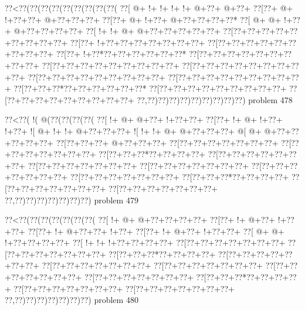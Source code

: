\vbox{\vbox{\goo
\0??<\0??(\0??(\0??(\0??(\0??(\0??(\0??(\0??(\0??(
\0??[\- @+\- !+\- !+\- !+\- !+\- @+\0??+\- @+\0??+
\0??[\0??+\- @+\- !+\0??+\0??+\- @+\0??+\0??+\0??+
\0??[\0??+\- @+\- !+\0??+\- @+\0??+\0??+\0??+\0??*
\0??[\- @+\- @+\- !+\0??+\- @+\0??+\0??+\0??+\0??+
\0??[\- !+\- !+\- @+\- @+\0??+\0??+\0??+\0??+\0??+
\0??[\0??+\0??+\0??+\0??+\0??+\0??+\0??+\0??+\0??+
\0??[\0??+\- !+\0??+\0??+\0??+\0??+\0??+\0??+\0??+
\0??[\0??+\0??+\0??+\0??+\0??+\0??+\0??+\0??+\0??+
\0??[\0??+\- !+\0??*\0??+\0??+\0??+\0??+\0??+\0??*
\0??[\0??+\0??+\0??+\0??+\0??+\0??+\0??+\0??+\0??+
\0??[\0??+\0??+\0??+\0??+\0??+\0??+\0??+\0??+\0??+
\0??[\0??+\0??+\0??+\0??+\0??+\0??+\0??+\0??+\0??+
\0??[\0??+\0??+\0??+\0??+\0??+\0??+\0??+\0??+\0??+
\0??[\0??+\0??+\0??+\0??+\0??+\0??+\0??+\0??+\0??+
\0??[\0??+\0??+\0??*\0??+\0??+\0??+\0??+\0??+\0??*
\0??[\0??+\0??+\0??+\0??+\0??+\0??+\0??+\0??+\0??+
\0??[\0??+\0??+\0??+\0??+\0??+\0??+\0??+\0??+\0??+
\0??,\0??)\0??)\0??)\0??)\0??)\0??)\0??)\0??)\0??)
}
\hfil problem 478\hfil\break
}

\vbox{\vbox{\goo
\0??<\0??(\- !(\- @(\0??(\0??(\0??(\0??(
\0??[\- !+\- @+\- @+\0??+\- !+\0??+\0??+
\0??[\0??+\- !+\- @+\- !+\0??+\- !+\0??+
\- ![\- @+\- !+\- !+\- @+\0??+\0??+\0??+
\- ![\- !+\- !+\- @+\- @+\0??+\0??+\0??+
\- @[\- @+\- @+\0??+\0??+\0??+\0??+\0??+
\0??[\0??+\0??+\0??+\- @+\0??+\0??+\0??+
\0??[\0??+\0??+\0??+\0??+\0??+\0??+\0??+
\0??[\0??+\0??+\0??+\0??+\0??+\0??+\0??+
\0??[\0??+\0??+\0??*\0??+\0??+\0??+\0??+
\0??[\0??+\0??+\0??+\0??+\0??+\0??+\0??+
\0??[\0??+\0??+\0??+\0??+\0??+\0??+\0??+
\0??[\0??+\0??+\0??+\0??+\0??+\0??+\0??+
\0??[\0??+\0??+\0??+\0??+\0??+\0??+\0??+
\0??[\0??+\0??+\0??+\0??+\0??+\0??+\0??+
\0??[\0??+\0??+\0??*\0??+\0??+\0??+\0??+
\0??[\0??+\0??+\0??+\0??+\0??+\0??+\0??+
\0??[\0??+\0??+\0??+\0??+\0??+\0??+\0??+
\0??,\0??)\0??)\0??)\0??)\0??)\0??)\0??)
}
\hfil problem 479\hfil\break
}

\vbox{\vbox{\goo
\0??<\0??(\0??(\0??(\0??(\0??(\0??(\0??(
\0??[\- !+\- @+\- @+\0??+\0??+\0??+\0??+
\0??[\0??+\- !+\- @+\0??+\- !+\0??+\0??+
\0??[\0??+\- !+\- @+\0??+\0??+\- !+\0??+
\0??[\0??+\- !+\- @+\0??+\- !+\0??+\0??+
\0??[\- @+\- @+\- !+\0??+\0??+\0??+\0??+
\0??[\- !+\- !+\- !+\0??+\0??+\0??+\0??+
\0??[\0??+\0??+\0??+\0??+\0??+\0??+\0??+
\0??[\0??+\0??+\0??+\0??+\0??+\0??+\0??+
\0??[\0??+\0??+\0??*\0??+\0??+\0??+\0??+
\0??[\0??+\0??+\0??+\0??+\0??+\0??+\0??+
\0??[\0??+\0??+\0??+\0??+\0??+\0??+\0??+
\0??[\0??+\0??+\0??+\0??+\0??+\0??+\0??+
\0??[\0??+\0??+\0??+\0??+\0??+\0??+\0??+
\0??[\0??+\0??+\0??+\0??+\0??+\0??+\0??+
\0??[\0??+\0??+\0??*\0??+\0??+\0??+\0??+
\0??[\0??+\0??+\0??+\0??+\0??+\0??+\0??+
\0??[\0??+\0??+\0??+\0??+\0??+\0??+\0??+
\0??,\0??)\0??)\0??)\0??)\0??)\0??)\0??)
}
\hfil problem 480\hfil\break
}

